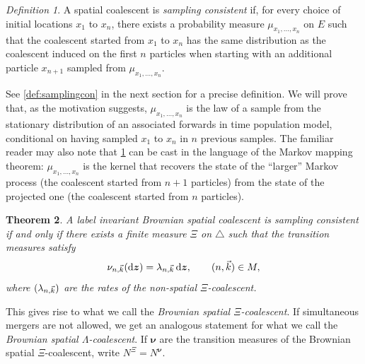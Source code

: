 \documentclass[reqno,draft]{amsart}
\numberwithin{equation}{section}
\theoremstyle{plain}
\newtheorem{theorem}{Theorem}[section]
\theoremstyle{remark}
\newtheorem{definition}[theorem]{Definition}
\newcommand*\diff{\mathop{}\!\mathrm{d}}
\newcommand{\mergers}{M}
\newcommand{\nunk}{\nu_{n,\smash{\vec{k}}}}
\newcommand{\lank}{\lambda_{n,\smash{\vec{k}}}}
\begin{document}
\begin{definition}\label{def:samplingconintro}
    A spatial coalescent is \emph{sampling consistent} if, for every choice of initial locations $x_1$ to $x_n$, there exists a probability measure $\mu_{x_1, \ldots ,x_n}$ on $E$ such that the coalescent started from $x_1$ to $x_n$ has the same distribution as the coalescent induced on the first $n$ particles when starting with an additional particle $x_{n+1}$ sampled from $\mu_{x_1, \ldots ,x_n}$.
\end{definition}

See \cref{def:samplingcon} in the next section for a precise definition. We will prove that, as the motivation suggests, $\mu_{x_1, \ldots ,x_n}$ is the law of a sample from the stationary distribution of an associated forwards in time population model, conditional on having sampled $x_1$ to $x_n$ in $n$ previous samples. The familiar reader may also note that \cref{def:samplingconintro} can be cast in the language of the Markov mapping theorem: $\mu_{x_1,\ldots ,x_n}$ is the kernel that recovers the state of the ``larger'' Markov process (the coalescent started from $n+1$ particles) from the state of the projected one (the coalescent started from $n$ particles).


\begin{theorem}\label{thm:samplingconintro}
    A label invariant Brownian spatial coalescent is sampling consistent if and only if there exists a finite measure $\Xi$ on $\triangle$ such that the transition measures satisfy \[
        \nunk(\diff \boldsymbol z) = \lank \diff \boldsymbol z,\qquad (n,\vec{k}) \in \mergers,
    \] where $(\lank)$ are the rates of the non-spatial $\Xi$-coalescent.
\end{theorem}
This gives rise to what we call the \emph{Brownian spatial $\Xi$-coalescent}.
If simultaneous mergers are not allowed, we get an analogous statement for what we call the \emph{Brownian spatial $\Lambda$-coalescent}.
If $\boldsymbol \nu$ are the transition measures of the Brownian spatial $\Xi$-coalescent, write $N^\Xi = N^{\boldsymbol \nu}$.

\end{document}
